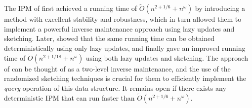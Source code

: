 \documentclass[11pt]{article}
\newcommand\Otil{\widetilde{O}}
\begin{document}
The IPM of \cite{cohen2021solving} first achieved a running time of $\Otil(n^{2+1/6}+n^\omega)$ by introducing a method with excellent stability and robustness, which in turn allowed them to implement a powerful inverse maintenance approach using lazy updates and sketching. 
Later, \cite{vdB20} showed that the same running time can be obtained deterministically using only lazy updates, and finally \cite{jiang2021faster} gave an improved running time of 
$\Otil(n^{2+1/18}+n^\omega)$ using both lazy updates and sketching.
The approach of \cite{jiang2021faster} can be thought of as a two-level inverse maintenance, and the use of the randomized sketching techniques is crucial for them to efficiently implement the {\it query} operation of this data structure. It remains open if there exists any deterministic IPM that can run faster than $\Otil(n^{2+1/6}+n^\omega)$.
\end{document}
